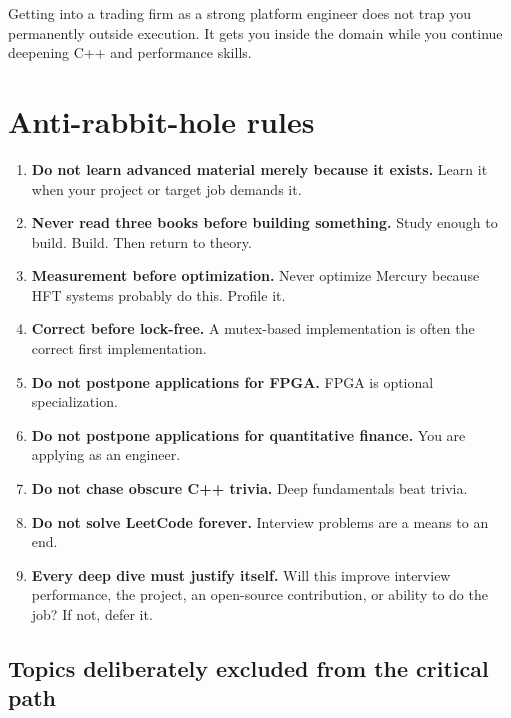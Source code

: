 \documentclass[11pt,letterpaper]{article}
\begin{document}
Getting into a trading firm as a strong platform engineer does not trap you permanently outside execution. It gets you inside the domain while you continue deepening C++ and performance skills.

\section{Anti-rabbit-hole rules}\label{sec:17}

\begin{enumerate}

\item \textbf{Do not learn advanced material merely because it exists.} Learn it when your project or target job demands it.

\item \textbf{Never read three books before building something.} Study enough to build. Build. Then return to theory.

\item \textbf{Measurement before optimization.} Never optimize Mercury because HFT systems probably do this. Profile it.

\item \textbf{Correct before lock-free.} A mutex-based implementation is often the correct first implementation.

\item \textbf{Do not postpone applications for FPGA.} FPGA is optional specialization.

\item \textbf{Do not postpone applications for quantitative finance.} You are applying as an engineer.

\item \textbf{Do not chase obscure C++ trivia.} Deep fundamentals beat trivia.

\item \textbf{Do not solve LeetCode forever.} Interview problems are a means to an end.

\item \textbf{Every deep dive must justify itself.} Will this improve interview performance, the project, an open-source contribution, or ability to do the job? If not, defer it.

\end{enumerate}

\subsection*{Topics deliberately excluded from the critical path}
\end{document}
